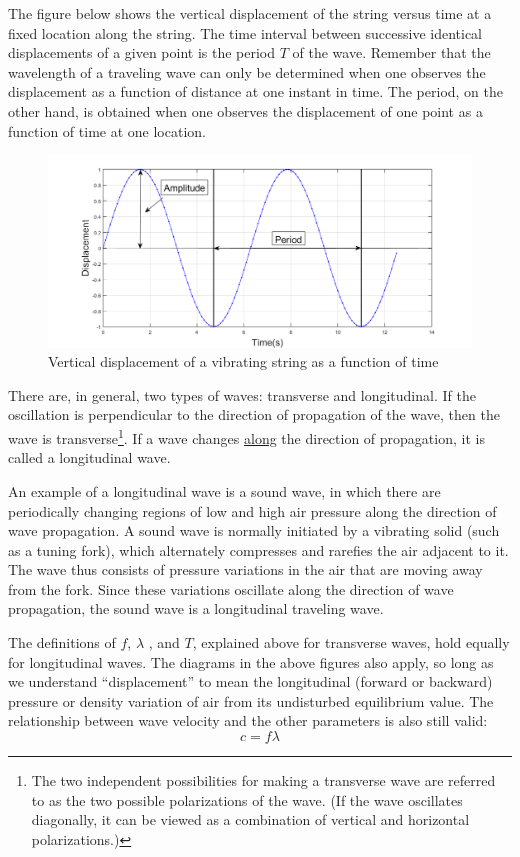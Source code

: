 The figure below shows the vertical displacement of the string versus time at a fixed location along the string. The time interval between successive identical displacements of a given point is the period $T$ of the wave. Remember that the wavelength of a traveling wave can only be determined when one observes the displacement as a function of distance at one instant in time. The period, on the other hand, is obtained when one observes the displacement of one point as a function of time at one location.\myskip
\begin{figure}[h]
\centering
\includegraphics[width=1.0\textwidth]{./Exp1-9/pic/page02.png}
\caption{Vertical displacement of a vibrating string as a function of time}
\end{figure}

There are, in general, two types of waves: transverse and longitudinal. If the oscillation is perpendicular to the direction of propagation of the wave, then the wave is transverse\footnote{The two independent possibilities for making a transverse wave are referred to as the two possible polarizations of the wave. (If the wave oscillates diagonally, it can be viewed as a combination of vertical and horizontal polarizations.)}. If a wave changes \underline{along} the direction of propagation, it is called a longitudinal wave. \myskip

An example of a longitudinal wave is a sound wave, in which there are periodically changing regions of low and high air pressure along the direction of wave propagation. A sound wave is normally initiated by a vibrating solid (such as a tuning fork), which alternately compresses and rarefies the air adjacent to it. The wave thus consists of pressure variations in the air that are moving away from the fork. Since these variations oscillate along the direction of wave propagation, the sound wave is a longitudinal traveling wave.\myskip

The definitions of $f$, $\lambda$ , and $T$, explained above for transverse waves, hold equally for longitudinal waves. The diagrams in the above figures also apply, so long as we understand ``displacement'' to mean the longitudinal (forward or backward) pressure or density variation of air from its undisturbed equilibrium value. The relationship between wave velocity and the other parameters is also still valid:
\begin{equation}
  c=f\lambda
\end{equation}

